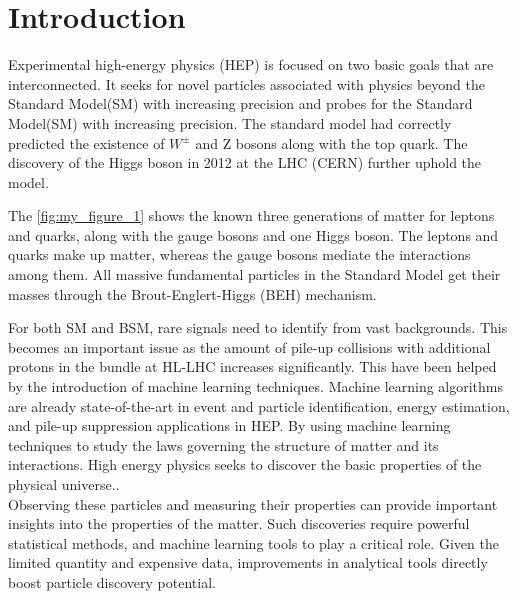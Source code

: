 \chapter{\label{intro}Introduction}
Experimental high-energy physics (HEP) is focused on two basic goals that are interconnected. It seeks for novel particles associated with physics beyond the Standard Model(SM) with increasing precision and probes for the Standard Model(SM) with increasing precision. The standard model had correctly predicted the existence of $W^\pm$ and Z bosons along with the top quark\cite{Salam:1964ry}\cite{GLASHOW1961579}\cite{PhysRevLett.19.1264}\cite{10.1143/PTP.49.634}. The discovery of the Higgs boson in 2012 at the LHC (CERN) further uphold the model\cite{Aad_2015}.

The \autoref{fig:my_figure_1} shows the known three generations of matter for leptons and quarks, along with the gauge bosons and one Higgs boson. The leptons and quarks make up matter, whereas the gauge bosons mediate the interactions among them. All massive fundamental particles in the Standard Model get their masses through the Brout-Englert-Higgs (BEH) mechanism.\cite{PhysRevLett.13.321}\cite{Higgs:1964pj}

For both SM and BSM, rare signals need to identify from vast backgrounds. This becomes an important issue as the amount of pile-up collisions with additional protons in the bundle at  HL-LHC increases significantly\cite{https://doi.org/10.48550/arxiv.1807.02876}. This have been helped by the introduction of machine learning techniques. Machine learning algorithms are already state-of-the-art in event and particle identification, energy estimation, and pile-up suppression applications in HEP. By using machine learning techniques to study the laws governing the structure of matter and  its interactions. High energy physics seeks to discover the basic properties of the physical universe.\cite{Baldi2014}.\\
Observing these particles and measuring their properties can provide important insights into the properties of the matter\cite{Higgs_snowmass}. Such discoveries require powerful statistical methods, 
and machine learning tools to play a critical role. Given the limited quantity and expensive data, improvements in analytical tools directly boost particle discovery potential. 



    
